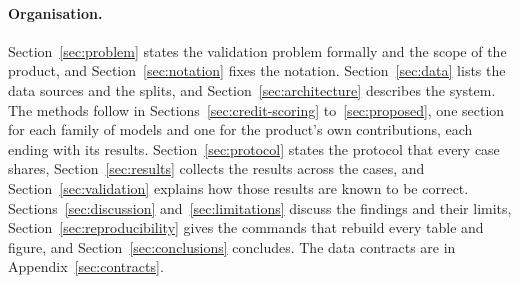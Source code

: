 \paragraph{Organisation.} Section~\ref{sec:problem} states the validation problem formally and the scope of the product, and Section~\ref{sec:notation} fixes the notation.
Section~\ref{sec:data} lists the data sources and the splits, and Section~\ref{sec:architecture} describes the system. The methods follow in
Sections~\ref{sec:credit-scoring} to~\ref{sec:proposed}, one section for each family of models and one for the product's own contributions, each ending with its results.
Section~\ref{sec:protocol} states the protocol that every case shares, Section~\ref{sec:results} collects the results across the cases, and
Section~\ref{sec:validation} explains how those results are known to be correct. Sections~\ref{sec:discussion} and~\ref{sec:limitations} discuss the findings and their
limits, Section~\ref{sec:reproducibility} gives the commands that rebuild every table and figure, and Section~\ref{sec:conclusions} concludes. The data contracts are in
Appendix~\ref{sec:contracts}.
